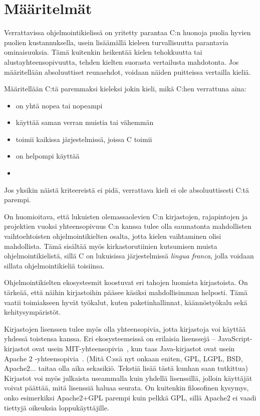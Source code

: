 \section{Määritelmät} 

Verrattavissa ohjelmointikielissä on yritetty parantaa C:n huonoja puolia
hyvien puolien kustannuksella, usein lisäämällä kieleen turvallisuutta
parantavia ominaisuuksia. Tämä kuitenkin heikentää kielen tehokkuutta tai
alustayhteensopivuutta, tehden kielten suorasta vertailusta mahdotonta. Jos
määritellään absoluuttiset reunaehdot, voidaan näiden puitteissa vertailla
kieliä.

Määritellään C:tä paremmaksi kieleksi jokin kieli, mikä C:hen verrattuna aina:

\begin{itemize}
    \item on yhtä nopea tai nopeampi
    \item käyttää saman verran muistia tai vähemmän
    \item toimii kaikissa järjestelmissä, joissa C toimii
    \item on helpompi käyttää 
    \item {}
\end{itemize}

Jos yksikin näistä kriteereistä ei pidä, verrattava kieli ei ole absoluuttisesti
C:tä parempi.

On huomioitava, että lukuisten olemassaolevien C:n kirjastojen, rajapintojen ja
projektien vuoksi yhteensopivuus C:n kanssa tulee olla saumatonta mahdollisten
vaihtoehtoisten ohjelmointikielten osalta, jotta kielen vaihtaminen olisi
mahdollista. Tämä sisältää myös kirkastorutiinien kutsumisen muista
ohjelmointikielistä, sillä C on lukuisissa järjestelmissä \emph{lingua franca},
jolla voidaan sillata ohjelmointikieliä toisiinsa.

Ohjelmointikielten ekosysteemit koostuvat eri tahojen luomista kirjastoista. On
tärkeää, että näihin kirjastoihin pääsee käsiksi mahdollisimman helposti. Tämä
vaatii toimiakseen hyvät työkalut, kuten paketinhallinnat, käännöstyökalu sekä
kehitysympäristöt.

Kirjastojen lisenssen tulee myös olla yhteensopivia, jotta kirjastoja voi
käyttää yhdessä toistensa kanssa. Eri ekosysteemeissä on erilaisia lisenssejä
-- JavaScript-kirjastot ovat usein MIT-yhteensopivia~\citationneeded, kun taas
Java-kirjastot ovat usein Apache 2 -yhteensopivia~\citationneeded. (Mitä C:ssä
nyt onkaan eniten, GPL, LGPL, BSD, Apache2... taitaa olla aika sekasikiö.
Tekstiä lisää tästä kunhan saan tutkittua)
Kirjastot voi myös julkaista useammalla kuin yhdellä lisenssillä, jolloin
käyttäjät voivat päättää, mitä lisenssiä haluaa seurata. On kuitenkin
filosofinen kysymys, onko esimerkiksi Apache2+GPL parempi kuin pelkkä GPL,
sillä Apache2 ei vaadi tiettyjä oikeuksia loppukäyttäjille.

